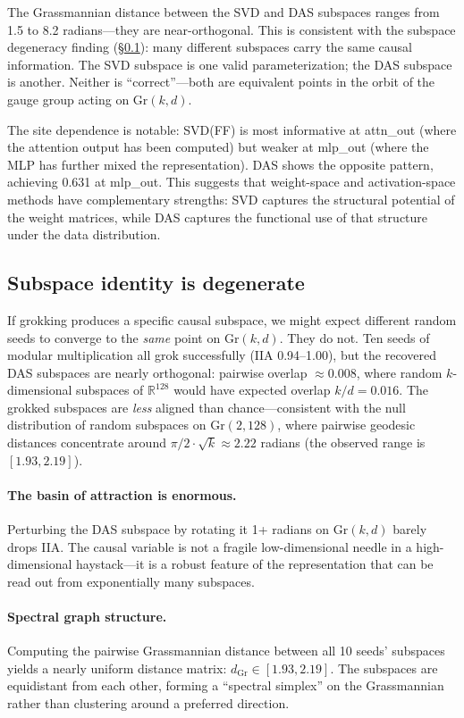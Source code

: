 \documentclass{article}
\newcommand{\Gr}{\mathrm{Gr}}
\newcommand{\IIA}{\mathrm{IIA}}
\newcommand{\R}{\mathbb{R}}
\begin{document}
The Grassmannian distance between the SVD and DAS subspaces ranges from
1.5 to 8.2 radians---they are near-orthogonal. This is consistent with
the subspace degeneracy finding (\S\ref{sec:gauge_freedom}): many different
subspaces carry the same causal information. The SVD subspace is one
valid parameterization; the DAS subspace is another. Neither is
``correct''---both are equivalent points in the orbit of the gauge
group acting on $\Gr(k,d)$.

The site dependence is notable: SVD(FF) is most informative at attn\_out
(where the attention output has been computed) but weaker at mlp\_out
(where the MLP has further mixed the representation). DAS shows the
opposite pattern, achieving 0.631 at mlp\_out. This suggests that
weight-space and activation-space methods have complementary strengths:
SVD captures the structural potential of the weight matrices, while DAS
captures the functional use of that structure under the data distribution.

\subsection{Subspace identity is degenerate}
\label{sec:gauge_freedom}

If grokking produces a specific causal subspace, we might expect different
random seeds to converge to the \emph{same} point on $\Gr(k,d)$. They do
not. Ten seeds of modular multiplication all grok successfully ($\IIA$
0.94--1.00), but the recovered DAS subspaces are nearly orthogonal: pairwise
overlap $\approx 0.008$, where random $k$-dimensional subspaces of
$\R^{128}$ would have expected overlap $k/d = 0.016$. The grokked subspaces
are \emph{less} aligned than chance---consistent with the null distribution
of random subspaces on $\Gr(2, 128)$, where pairwise geodesic distances
concentrate around $\pi/2 \cdot \sqrt{k} \approx 2.22$ radians (the
observed range is $[1.93, 2.19]$).

\paragraph{The basin of attraction is enormous.}
Perturbing the DAS subspace by rotating it 1+ radians on $\Gr(k,d)$
barely drops IIA. The causal variable is not a fragile low-dimensional
needle in a high-dimensional haystack---it is a robust feature of the
representation that can be read out from exponentially many subspaces.

\paragraph{Spectral graph structure.}
Computing the pairwise Grassmannian distance between all 10 seeds'
subspaces yields a nearly uniform distance matrix:
$d_{\Gr} \in [1.93, 2.19]$. The subspaces are equidistant from each other,
forming a ``spectral simplex'' on the Grassmannian rather than clustering
around a preferred direction.
\end{document}
